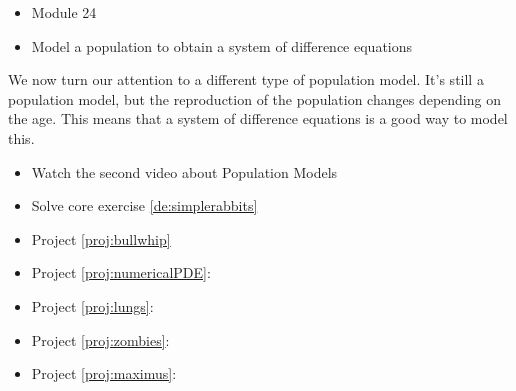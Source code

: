 \begin{lesson}

	\begin{itemize}
		\item Module 24
	\end{itemize}

	\begin{itemize}
		\item Model a population to obtain a system of difference equations
	\end{itemize}
	

We now turn our attention to a different type of population model. 
It's still a population model, but the reproduction of the population changes depending on the age.
This means that a system of difference equations is a good way to model this.

\begin{itemize}
	\item Watch the second video about Population Models
	\item Solve core exercise \ref{de:simplerabbits}
\end{itemize}

\begin{itemize}
	\item Project \ref{proj:bullwhip} \bullwhiptitle
	\item Project \ref{proj:numericalPDE}: \numericalPDEtitle
	\item Project \ref{proj:lungs}:\lungstitle
	\item Project \ref{proj:zombies}: \zombiestitle
	\item Project \ref{proj:maximus}: \maximustitle
\end{itemize}


\end{lesson}



